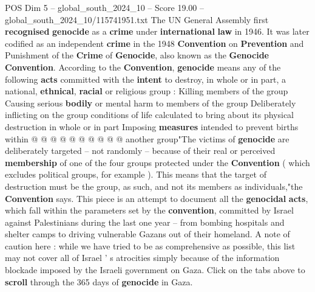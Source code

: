 \begin{textsample}{POS Dim 5 – global\_south\_2024\_10 – Score 19.00 – global\_south\_2024\_10/115741951.txt}
The UN General Assembly first \textbf{recognised} \textbf{genocide} as a \textbf{crime} under \textbf{international} \textbf{law} in 1946.
It was later codified as an independent \textbf{crime} in the 1948 \textbf{Convention} on \textbf{Prevention} and Punishment of the \textbf{Crime} of \textbf{Genocide}, also known as the \textbf{Genocide} \textbf{Convention}.
According to the \textbf{Convention}, \textbf{genocide} means any of the following \textbf{acts} committed with the \textbf{intent} to destroy, in whole or in part, a national, \textbf{ethnical}, \textbf{racial} or religious group : Killing members of the group Causing serious \textbf{bodily} or mental harm to members of the group Deliberately inflicting on the group conditions of life calculated to bring about its physical destruction in whole or in part Imposing \textbf{measures} intended to prevent births within @ @ @ @ @ @ @ @ @ @ another group"The victims of \textbf{genocide} are deliberately targeted -- not randomly -- because of their real or perceived \textbf{membership} of one of the four groups protected under the \textbf{Convention} ( which excludes political groups, for example ).
This means that the target of destruction must be the group, as such, and not its members as individuals,"the \textbf{Convention} says.
This piece is an attempt to document all the \textbf{genocidal} \textbf{acts}, which fall within the parameters set by the \textbf{convention}, committed by Israel against Palestinians during the last one year -- from bombing hospitals and shelter camps to driving vulnerable Gazans out of their homeland.
A note of caution here : while we have tried to be as comprehensive as possible, this list may not cover all of Israel ' s atrocities simply because of the information blockade imposed by the Israeli government on Gaza.
Click on the tabs above to \textbf{scroll} through the 365 days of \textbf{genocide} in Gaza.

\end{textsample}
